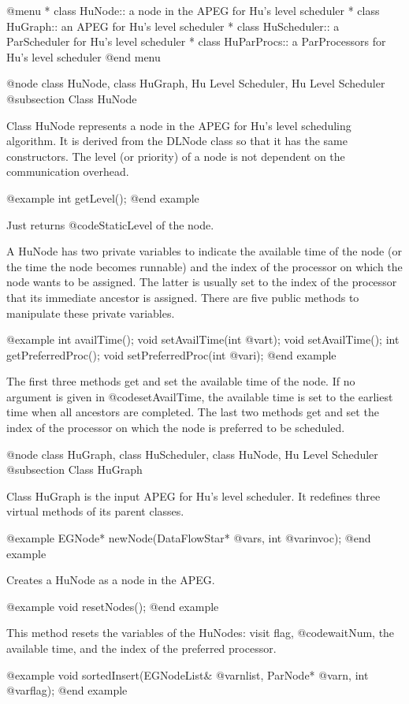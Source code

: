 @menu
* class HuNode::		a node in the APEG for Hu's level scheduler
* class HuGraph::		an APEG for Hu's level scheduler
* class HuScheduler::		a ParScheduler for Hu's level scheduler
* class HuParProcs::		a ParProcessors for Hu's level scheduler
@end menu

@node class HuNode, class HuGraph, Hu Level Scheduler, Hu Level Scheduler
@subsection Class HuNode

Class HuNode represents a node in the APEG for Hu's level scheduling algorithm.
It is derived from the DLNode class so that it has the same constructors.
The level (or priority) of a node is not dependent on the communication 
overhead.

@example
int getLevel();
@end example

Just returns @code{StaticLevel} of the node.

A HuNode has two private variables to indicate the available time of the node
(or the time the node becomes runnable)
and the index of the processor on which the node wants to be assigned. 
The latter is usually set to the index of the processor that its immediate
ancestor is assigned. There are five public methods to manipulate these
private variables.

@example
int availTime();
void setAvailTime(int @var{t});
void setAvailTime();
int getPreferredProc();
void setPreferredProc(int @var{i});
@end example

The first three methods get and set the available time of the node. If no
argument is given in @code{setAvailTime}, the available time is set to
the earliest time when all ancestors are completed. The last two methods
get and set the index of the processor on which
the node is preferred to be scheduled.

@node class HuGraph, class HuScheduler, class HuNode, Hu Level Scheduler
@subsection Class HuGraph

Class HuGraph is the input APEG for Hu's level scheduler. It redefines
three virtual methods of its parent classes.

@example
EGNode* newNode(DataFlowStar* @var{s}, int @var{invoc});
@end example

Creates a HuNode as a node in the APEG.

@example
void resetNodes();
@end example

This method resets the variables of the HuNodes: visit flag, @code{waitNum},
the available time, and the index of the preferred processor.

@example
void sortedInsert(EGNodeList& @var{nlist}, ParNode* @var{n}, int @var{flag});
@end example

